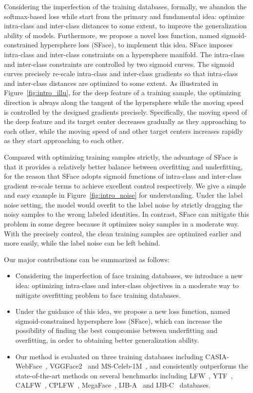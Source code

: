 \documentclass[journal,comsoc]{IEEEtran}
\begin{document}
Considering the imperfection of the training databases, formally, we abandon the softmax-based loss while start from the primary and fundamental idea: optimize intra-class and inter-class distances to some extent, to improve the generalization ability of models. Furthermore, we propose a novel loss function, named sigmoid-constrained hypersphere loss (SFace), to implement this idea. SFace imposes intra-class and inter-class constraints on a hypersphere manifold. The intra-class and inter-class constraints are controlled by two sigmoid curves. The sigmoid curves precisely re-scale intra-class and inter-class gradients so that intra-class and inter-class distances are optimized to some extent. As illustrated in Figure~\ref{fig:intro_illu}, for the deep feature  of a training sample, the optimizing direction is always along the tangent of the hypersphere while the moving speed is controlled by the designed gradients precisely. Specifically, the moving speed of the deep feature  and its target center  decreases gradually as they approaching to each other, while the moving speed of  and other target centers  increases rapidly as they start approaching to each other.

Compared with optimizing training samples strictly, the advantage of SFace is that it provides a relatively better balance between overfitting and underfitting, for the reason that SFace adopts sigmoid functions of intra-class and inter-class gradient re-scale terms to achieve excellent control respectively. We give a simple and easy example in Figure~\ref{fig:intro_noise} for understanding. Under the label noise setting, the model would overfit to the label noise by strictly dragging the noisy samples to the wrong labeled identities. In contrast, SFace can mitigate this problem in some degree because it optimizes noisy samples in a moderate way. With the precisely control, the clean training samples are optimized earlier and more easily, while the label noise can be left behind. 

Our major contributions can be summarized as follows:
\begin{itemize}
\item{Considering the imperfection of face training databases, we introduce a new idea: optimizing intra-class and inter-class objectives in a moderate way to mitigate overfitting problem to face training databases.}
\item{Under the guidance of this idea, we propose a new loss function, named sigmoid-constrained hypersphere loss (SFace), which can increase the possibility of finding the best compromise between underfitting and overfitting, in order to obtaining better generalization ability.}
\item{Our method is evaluated on three training databases including CASIA-WebFace~\cite{Yi2014CASIA}, VGGFace2~\cite{Cao18} and MS-Celeb-1M~\cite{guo2016msceleb}, and consistently outperforms the state-of-the-art methods on several benchmarks including LFW~\cite{LFWTech}, YTF~\cite{Wolf2011Face}, CALFW~\cite{zheng2017CALFW}, CPLFW~\cite{CPLFWTech}, MegaFace~\cite{kemelmacher2016megaface}, IJB-A~\cite{klare2015pushing} and IJB-C~\cite{maze2018iarpa} databases. }
\end{itemize}
\end{document}

